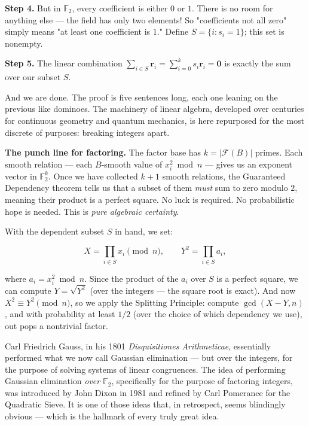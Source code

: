 \documentclass[11pt,twoside,openright]{book}
\theoremstyle{definition}
\theoremstyle{remark}
\begin{document}
\textbf{Step 4.} But in $\mathbb{F}_2$, every coefficient is either $0$ or $1$. There is no room for anything else --- the field has only two elements! So "coefficients not all zero" simply means "at least one coefficient is $1$." Define $S = \{i : s_i = 1\}$; this set is nonempty.

\textbf{Step 5.} The linear combination $\sum_{i \in S} \mathbf{r}_i = \sum_{i=0}^k s_i \mathbf{r}_i = \mathbf{0}$ is exactly the sum over our subset $S$.

And we are done. The proof is five sentences long, each one leaning on the previous like dominoes. The machinery of linear algebra, developed over centuries for continuous geometry and quantum mechanics, is here repurposed for the most discrete of purposes: breaking integers apart.

\textbf{The punch line for factoring.} The factor base has $k = |\mathcal{F}(B)|$ primes. Each smooth relation --- each $B$-smooth value of $x_i^2 \bmod n$ --- gives us an exponent vector in $\mathbb{F}_2^k$. Once we have collected $k + 1$ smooth relations, the Guaranteed Dependency theorem tells us that a subset of them \textit{must} sum to zero modulo $2$, meaning their product is a perfect square. No luck is required. No probabilistic hope is needed. This is \textit{pure algebraic certainty}.

With the dependent subset $S$ in hand, we set:

\[X = \prod_{i \in S} x_i \pmod{n}, \qquad Y^2 = \prod_{i \in S} a_i,\]

where $a_i = x_i^2 \bmod n$. Since the product of the $a_i$ over $S$ is a perfect square, we can compute $Y = \sqrt{Y^2}$ (over the integers --- the square root is exact). And now $X^2 \equiv Y^2 \pmod{n}$, so we apply the Splitting Principle: compute $\gcd(X - Y, n)$, and with probability at least $1/2$ (over the choice of which dependency we use), out pops a nontrivial factor.


Carl Friedrich Gauss, in his 1801 \textit{Disquisitiones Arithmeticae}, essentially performed what we now call Gaussian elimination --- but over the integers, for the purpose of solving systems of linear congruences. The idea of performing Gaussian elimination \textit{over $\mathbb{F}_2$}, specifically for the purpose of factoring integers, was introduced by John Dixon in 1981 and refined by Carl Pomerance for the Quadratic Sieve. It is one of those ideas that, in retrospect, seems blindingly obvious --- which is the hallmark of every truly great idea.
\end{document}
